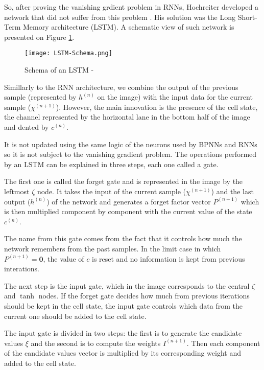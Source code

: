So, after proving the vanishing grdient problem in RNNs, Hochreiter developed a network that did not suffer from this problem \cite{hochreiter1997long}.
His solution was the Long Short-Term Memory architecture (LSTM).
A schematic view of such network is presented on Figure \ref{fig:LSTMSchema}.

\begin{figure}
    \begin{center}
        \texttt{[image: LSTM-Schema.png]}
        \caption[Schema of an LSTM]{Schema of an LSTM - \cite{rahman2019nonintrusive}}
        \label{fig:LSTMSchema}
    \end{center}
\end{figure}

Simillarly to the RNN architecture, we combine the output of the previous sample (represented by $h^{(n)}$ on the image) with the input data for the current sample ($\chi^{(n+1)}$).
However, the main innovation is the presence of the cell state, the channel represented by the horizontal lane in the bottom half of the image and dented by $c^{(n)}$.

It is not updated using the same logic of the neurons used by BPNNs and RNNs so it is not subject to the vanishing gradient problem.
The operations performed by an LSTM can be explained in three steps, each one called a gate.

The first one is called the forget gate and is represented in the image by the leftmost $\zeta$ node.
It takes the input of the current sample ($\chi^{(n+1)}$) and the last output ($h^{(n)}$) of the network and generates a forget factor vector $P^{(n+1)}$ which is then multiplied component by component with the current value of the state $c^{(n)}$.

The name from this gate comes from the fact that it controls how much the network remembers from the past samples.
In the limit case in which $P^{(n+1)} = \mathbf{0}$, the value of $c$ is reset and no information is kept from previous interations.

The next step is the input gate, which in the image corresponds to the central $\zeta$ and $\tanh$ nodes.
If the forget gate decides how much from previous iterations should be kept in the cell state, the input gate controls which data from the current one should be added to the cell state.

The input gate is divided in two steps: the first is to generate the candidate values $\xi$ and the second is to compute the weights $I^{(n+1)}$.
Then each component of the candidate values vector is multiplied by its corresponding weight and added to the cell state.


